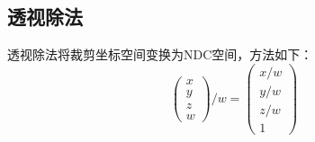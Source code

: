 	\subsection{透视除法}
	\begin{spacing}{2.5}
	透视除法将裁剪坐标空间变换为NDC空间，方法如下：
	\begin{equation}
		\begin{pmatrix}
		x\\ 
		y\\ 
		z\\ 
		w
	\end{pmatrix}/w=\begin{pmatrix}
		x/w\\ 
		y/w\\ 
		z/w\\ 
		1
	\end{pmatrix}
	\end{equation}
	\end{spacing}
